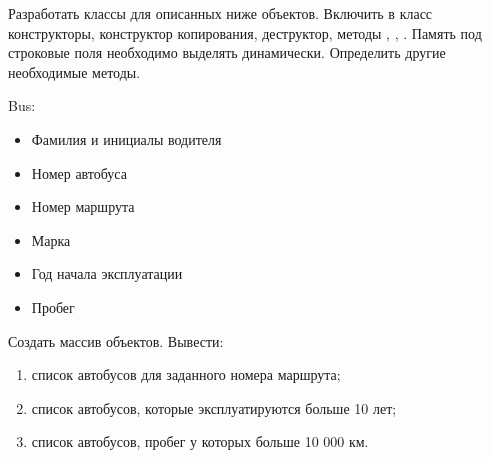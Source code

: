 
Разработать классы для описанных ниже объектов. Включить в класс
конструкторы, конструктор копирования, деструктор, методы ,
, . Память под строковые поля необходимо выделять
динамически. Определить другие необходимые методы.

Bus:
\begin{itemize}
	\item Фамилия и инициалы водителя
	\item Номер автобуса
	\item Номер маршрута
	\item Марка
	\item Год начала эксплуатации
	\item Пробег
\end{itemize}

Создать массив объектов. Вывести:
\begin{enumerate}
	\item список автобусов для заданного номера маршрута;
	\item список автобусов, которые эксплуатируются больше 10 лет;
	\item список автобусов, пробег у которых больше 10 000 км.
\end{enumerate}
